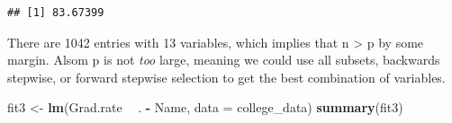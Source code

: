 \documentclass[]{article}
\newenvironment{Shaded}{\begin{snugshade}}{\end{snugshade}}
\newcommand{\KeywordTok}[1]{\textcolor[rgb]{0.13,0.29,0.53}{\textbf{#1}}}
\newcommand{\DataTypeTok}[1]{\textcolor[rgb]{0.13,0.29,0.53}{#1}}
\newcommand{\StringTok}[1]{\textcolor[rgb]{0.31,0.60,0.02}{#1}}
\newcommand{\OperatorTok}[1]{\textcolor[rgb]{0.81,0.36,0.00}{\textbf{#1}}}
\newcommand{\NormalTok}[1]{#1}
\begin{document}
\begin{verbatim}
## [1] 83.67399
\end{verbatim}

There are 1042 entries with 13 variables, which implies that n
\textgreater{} p by some margin. Alsom p is not \emph{too} large,
meaning we could use all subsets, backwards stepwise, or forward
stepwise selection to get the best combination of variables.

\begin{Shaded}
\begin{Highlighting}[]
\NormalTok{fit3 <-}\StringTok{ }\KeywordTok{lm}\NormalTok{(Grad.rate }\OperatorTok{~}\StringTok{ }\NormalTok{. }\OperatorTok{-}\StringTok{ }\NormalTok{Name, }\DataTypeTok{data =}\NormalTok{ college_data)}
\KeywordTok{summary}\NormalTok{(fit3)}
\end{Highlighting}
\end{Shaded}
\end{document}
